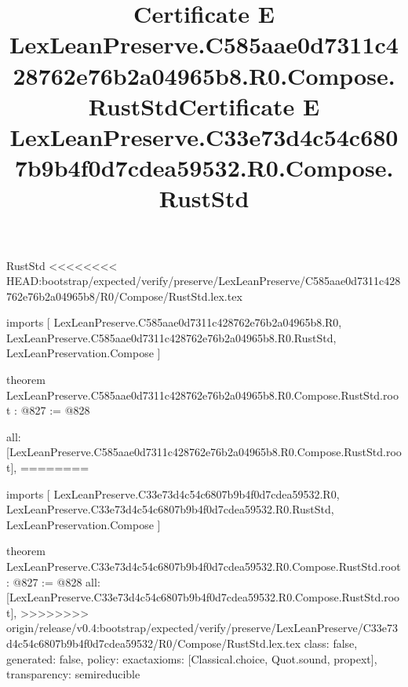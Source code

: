 \begin{lexlean}{RustStd}
<<<<<<<< HEAD:bootstrap/expected/verify/preserve/LexLeanPreserve/C585aae0d7311c428762e76b2a04965b8/R0/Compose/RustStd.lex.tex
\title{Certificate E LexLeanPreserve.C585aae0d7311c428762e76b2a04965b8.R0.Compose.RustStd}
\begin{coremodule}
imports [
  LexLeanPreserve.C585aae0d7311c428762e76b2a04965b8.R0,
  LexLeanPreserve.C585aae0d7311c428762e76b2a04965b8.R0.RustStd,
  LexLeanPreservation.Compose
]

theorem LexLeanPreserve.C585aae0d7311c428762e76b2a04965b8.R0.Compose.RustStd.root : @827 := @828 {
  all: [LexLeanPreserve.C585aae0d7311c428762e76b2a04965b8.R0.Compose.RustStd.root],
========
\title{Certificate E LexLeanPreserve.C33e73d4c54c6807b9b4f0d7cdea59532.R0.Compose.RustStd}
\begin{coremodule}
imports [
  LexLeanPreserve.C33e73d4c54c6807b9b4f0d7cdea59532.R0,
  LexLeanPreserve.C33e73d4c54c6807b9b4f0d7cdea59532.R0.RustStd,
  LexLeanPreservation.Compose
]

theorem LexLeanPreserve.C33e73d4c54c6807b9b4f0d7cdea59532.R0.Compose.RustStd.root : @827 := @828 {
  all: [LexLeanPreserve.C33e73d4c54c6807b9b4f0d7cdea59532.R0.Compose.RustStd.root],
>>>>>>>> origin/release/v0.4:bootstrap/expected/verify/preserve/LexLeanPreserve/C33e73d4c54c6807b9b4f0d7cdea59532/R0/Compose/RustStd.lex.tex
  class: false,
  generated: false,
  policy: exact{axioms: [Classical.choice, Quot.sound, propext]},
  transparency: semireducible
}


\end{coremodule}}
\end{coremodule}
\end{lexlean}

